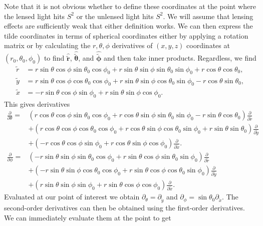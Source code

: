 \documentclass[11pt]{article} %
\begin{document}
Note that it is not obvious whether to define these coordinates at the point where the lensed light hits $S^2$ or the unlensed light hits $S^2$. We will assume that lensing effects are sufficiently weak that either definition works. We can then express the tilde coordinates in terms of spherical coordinates either by applying a rotation matrix or by calculating the $r, \theta, \phi$ derivatives of $(x,y,z)$ coordinates at $(r_0, \theta_0, \phi_0)$ to find $\hat{\tilde{\mathbf r}}$, $\hat{\tilde{\boldsymbol{\theta}}}$, and $\hat{\tilde{\boldsymbol{\phi}}}$ and then take inner products. Regardless, we find
\begin{align}
    \tilde r &= r\sin\theta\cos\phi\sin\theta_0\cos\phi_0+r\sin\theta\sin\phi\sin\theta_0\sin\phi_0+r\cos\theta\cos\theta_0,\\
    \tilde y &= r\sin\theta\cos\phi\cos\theta_0\cos\phi_0+r\sin\theta\sin\phi\cos\theta_0\sin\phi_0-r\cos\theta\sin\theta_0,\\
    \tilde x &= -r\sin\theta\cos\phi\sin\phi_0+r\sin\theta\sin\phi\cos\phi_0.
\end{align}
This gives derivatives
\begin{align*}
    \frac{\partial}{\partial \theta} = & \left( r \cos \theta \cos \phi \sin \theta_0 \cos \phi_0 + r \cos \theta \sin \phi \sin \theta_0 \sin \phi_0 - r \sin \theta \cos \theta_0 \right) \frac{\partial}{\partial \tilde{r}} \\
    & + \left( r \cos \theta \cos \phi \cos \theta_0 \cos \phi_0 + r \cos \theta \sin \phi \cos \theta_0 \sin \phi_0 + r \sin \theta \sin \theta_0 \right) \frac{\partial}{\partial \tilde{y}} \\
    & + \left( -r \cos \theta \cos \phi \sin \phi_0 + r \cos \theta \sin \phi \cos \phi_0 \right) \frac{\partial}{\partial \tilde{x}}.\\
    \frac{\partial}{\partial \phi} = & \left( -r \sin \theta \sin \phi \sin \theta_0 \cos \phi_0 + r \sin \theta \cos \phi \sin \theta_0 \sin \phi_0 \right) \frac{\partial}{\partial \tilde{r}} \\
& + \left( -r \sin \theta \sin \phi \cos \theta_0 \cos \phi_0 + r \sin \theta \cos \phi \cos \theta_0 \sin \phi_0 \right) \frac{\partial}{\partial \tilde{y}} \\
& + \left( r \sin \theta \sin \phi \sin \phi_0 + r \sin \theta \cos \phi \cos \phi_0 \right) \frac{\partial}{\partial \tilde{x}}.
\end{align*}
Evaluated at our point of interest we obtain $\partial_\theta=\partial_{\tilde y}$ and $\partial_\phi=\sin\theta_0\partial_{\tilde x}$. The second-order derivatives can then be obtained using the first-order derivatives. We can immediately evaluate them at the point to get
\end{document}
